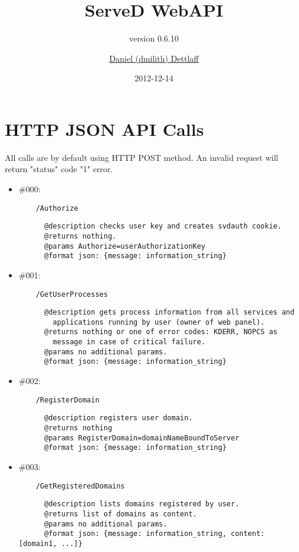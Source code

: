 \documentclass[11pt,a4paper]{scrartcl}
\title{ServeD WebAPI}
\author{\href{mailto:dmilith@verknowsys.com}{Daniel (dmilith) Dettlaff}}
\subtitle{version 0.6.10}
\date{2012-12-14}
\begin{document}
\maketitle

\section{HTTP JSON API Calls}\label{sec:apicalls}
  All calls are by default using HTTP POST method.
  An invalid request will return "status" code "1" error.

  \begin{itemize}

    \item \#000:
      \begin{verbatim}
    /Authorize
      \end{verbatim}
      \begin{verbatim}
      @description checks user key and creates svdauth cookie.
      @returns nothing.
      @params Authorize=userAuthorizationKey
      @format json: {message: information_string}
      \end{verbatim}

    \item \#001:
      \begin{verbatim}
    /GetUserProcesses
      \end{verbatim}
      \begin{verbatim}
      @description gets process information from all services and
        applications running by user (owner of web panel).
      @returns nothing or one of error codes: KDERR, NOPCS as
        message in case of critical failure.
      @params no additional params.
      @format json: {message: information_string}
      \end{verbatim}

    \item \#002:
      \begin{verbatim}
    /RegisterDomain
      \end{verbatim}
      \begin{verbatim}
      @description registers user domain.
      @returns nothing
      @params RegisterDomain=domainNameBoundToServer
      @format json: {message: information_string}
      \end{verbatim}

    \item \#003:
      \begin{verbatim}
    /GetRegisteredDomains
      \end{verbatim}
      \begin{verbatim}
      @description lists domains registered by user.
      @returns list of domains as content.
      @params no additional params.
      @format json: {message: information_string, content: [domain1, ...]}
      \end{verbatim}


\end{itemize}
\end{document}
